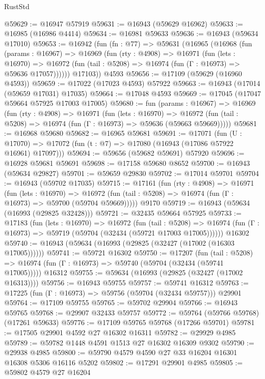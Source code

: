 \begin{lexlean}{RustStd}
\begin{coremodule}
@59629 := @16947 @57919
@59631 := @16943 (@59629 @16962)
@59633 := @16985 (@16986 @4414)
@59634 := @16981 @59633
@59636 := @16943 (@59634 @17010)
@59653 := @16942
    (fun (fn : @77) =>
    @59631
      (@16965
        (@16968
          (fun (params : @16967) =>
          @16969
            (fun (rty : @4908) =>
            @16971
              (fun (lets : @16970) =>
              @16972 (fun (tail : @5208) => @16974 (fun (Γ : @16973) => @59636 @17057))))))
        @17103))
    @4593
@59656 := @17109 (@59629 (@16960 @4593))
@59659 := @17022 (@17023 @4593) @57922
@59663 := @16943 (@17014 (@59659 @17031) @17035)
@59664 := @17048 @4593
@59669 := @17045 (@17047 @59664 @57925 @17003 @17005)
@59680 := fun (params : @16967) =>
  @16969
    (fun (rty : @4908) =>
    @16971
      (fun (lets : @16970) =>
      @16972 (fun (tail : @5208) => @16974 (fun (Γ : @16973) => @59636 (@59663 @59669)))))
@59681 := @16968 @59680
@59682 := @16965 @59681
@59691 := @17071
    (fun (U : @17070) => @17072 (fun (t : @7) => @17080 (@16943 (@17086 @57922 @16961) @17097)))
@59694 := @59656 (@59682 @59691) @57920
@59696 := @16928 @59681 @59691
@59698 := @17158 @59680 @8652
@59700 := @16943 (@59634 @29827)
@59701 := @59659 @29830
@59702 := @17014 @59701
@59704 := @16943 (@59702 @17035)
@59715 := @17161
    (fun (rty : @4908) =>
    @16971
      (fun (lets : @16970) =>
      @16972 (fun (tail : @5208) => @16974 (fun (Γ : @16973) => @59700 (@59704 @59669)))))
    @9170
@59719 := @16943 (@59634 (@16993 (@29825 @32428)))
@59721 := @32435 @59664 @57925
@59733 := @17183
    (fun (lets : @16970) =>
    @16972
      (fun (tail : @5208) =>
      @16974 (fun (Γ : @16973) => @59719 (@59704 (@32434 (@59721 @17003 @17005))))))
    @16302
@59740 := @16943 (@59634 (@16993 (@29825 (@32427 (@17002 (@16303 @17005))))))
@59741 := @59721 @16302
@59750 := @17207
    (fun (tail : @5208) => @16974 (fun (Γ : @16973) => @59740 (@59704 (@32434 (@59741 @17005)))))
    @16312
@59755 := @59634 (@16993 (@29825 (@32427 (@17002 @16313))))
@59756 := @16943 @59755
@59757 := @59741 @16312
@59763 := @17225 (fun (Γ : @16973) => @59756 (@59704 (@32434 @59757))) @29901
@59764 := @17109 @59755
@59765 := @59702 @29904
@59766 := @16943 @59765
@59768 := @29907 @32433 @59757
@59772 := @59764 (@59766 @59768) (@17261 @59633)
@59776 := @17109 @59765 @59768 (@17266 @59701)
@59781 := @17505 @29901 @4592 @27 @16302 @16311
@59782 := @29929 @4985
@59789 := @59782 @1448 @4591 @1513 @27 @16302 @16309 @9302
@59790 := @29938 @4985
@59800 := @59790 @4579 @4590 @27 @33 @16204 @16301 @16308 @5306 @16116 @5202
@59802 := @17291 @29901 @4985
@59805 := @59802 @4579 @27 @16204

\end{coremodule}
\end{lexlean}
